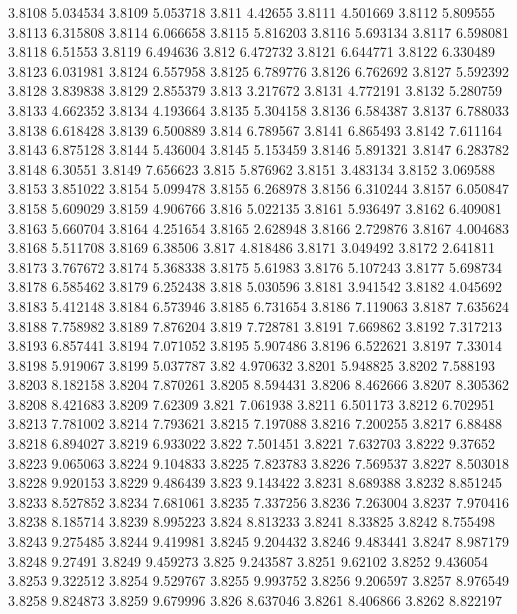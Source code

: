 3.8108  5.034534
3.8109  5.053718
3.811  4.42655
3.8111  4.501669
3.8112  5.809555
3.8113  6.315808
3.8114  6.066658
3.8115  5.816203
3.8116  5.693134
3.8117  6.598081
3.8118  6.51553
3.8119  6.494636
3.812  6.472732
3.8121  6.644771
3.8122  6.330489
3.8123  6.031981
3.8124  6.557958
3.8125  6.789776
3.8126  6.762692
3.8127  5.592392
3.8128  3.839838
3.8129  2.855379
3.813  3.217672
3.8131  4.772191
3.8132  5.280759
3.8133  4.662352
3.8134  4.193664
3.8135  5.304158
3.8136  6.584387
3.8137  6.788033
3.8138  6.618428
3.8139  6.500889
3.814  6.789567
3.8141  6.865493
3.8142  7.611164
3.8143  6.875128
3.8144  5.436004
3.8145  5.153459
3.8146  5.891321
3.8147  6.283782
3.8148  6.30551
3.8149  7.656623
3.815  5.876962
3.8151  3.483134
3.8152  3.069588
3.8153  3.851022
3.8154  5.099478
3.8155  6.268978
3.8156  6.310244
3.8157  6.050847
3.8158  5.609029
3.8159  4.906766
3.816  5.022135
3.8161  5.936497
3.8162  6.409081
3.8163  5.660704
3.8164  4.251654
3.8165  2.628948
3.8166  2.729876
3.8167  4.004683
3.8168  5.511708
3.8169  6.38506
3.817  4.818486
3.8171  3.049492
3.8172  2.641811
3.8173  3.767672
3.8174  5.368338
3.8175  5.61983
3.8176  5.107243
3.8177  5.698734
3.8178  6.585462
3.8179  6.252438
3.818  5.030596
3.8181  3.941542
3.8182  4.045692
3.8183  5.412148
3.8184  6.573946
3.8185  6.731654
3.8186  7.119063
3.8187  7.635624
3.8188  7.758982
3.8189  7.876204
3.819  7.728781
3.8191  7.669862
3.8192  7.317213
3.8193  6.857441
3.8194  7.071052
3.8195  5.907486
3.8196  6.522621
3.8197  7.33014
3.8198  5.919067
3.8199  5.037787
3.82  4.970632
3.8201  5.948825
3.8202  7.588193
3.8203  8.182158
3.8204  7.870261
3.8205  8.594431
3.8206  8.462666
3.8207  8.305362
3.8208  8.421683
3.8209  7.62309
3.821  7.061938
3.8211  6.501173
3.8212  6.702951
3.8213  7.781002
3.8214  7.793621
3.8215  7.197088
3.8216  7.200255
3.8217  6.88488
3.8218  6.894027
3.8219  6.933022
3.822  7.501451
3.8221  7.632703
3.8222  9.37652
3.8223  9.065063
3.8224  9.104833
3.8225  7.823783
3.8226  7.569537
3.8227  8.503018
3.8228  9.920153
3.8229  9.486439
3.823  9.143422
3.8231  8.689388
3.8232  8.851245
3.8233  8.527852
3.8234  7.681061
3.8235  7.337256
3.8236  7.263004
3.8237  7.970416
3.8238  8.185714
3.8239  8.995223
3.824  8.813233
3.8241  8.33825
3.8242  8.755498
3.8243  9.275485
3.8244  9.419981
3.8245  9.204432
3.8246  9.483441
3.8247  8.987179
3.8248  9.27491
3.8249  9.459273
3.825  9.243587
3.8251  9.62102
3.8252  9.436054
3.8253  9.322512
3.8254  9.529767
3.8255  9.993752
3.8256  9.206597
3.8257  8.976549
3.8258  9.824873
3.8259  9.679996
3.826  8.637046
3.8261  8.406866
3.8262  8.822197

